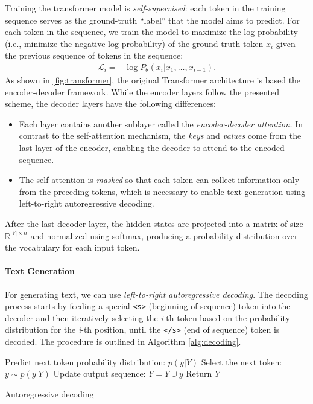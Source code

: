 {Training the transformer model is \emph{self-supervised}: each token in the training sequence serves as the ground-truth ``label'' that the model aims to predict. For each token in the sequence, we train the model to maximize the log probability (i.e., minimize the negative log probability) of the ground truth token $x_i$ given the previous sequence of tokens in the sequence:
\begin{align}
    \mathcal{L}_i = -\log P_\theta(x_i|x_1, \hdots, x_{i-1}).
\end{align}
As shown in \autoref{fig:transformer}, the original Transformer architecture is based the encoder-decoder framework. While the encoder layers follow the presented scheme, the decoder layers have the following differences:
\begin{itemize}
    \item Each layer contains another sublayer called the \emph{encoder-decoder attention}. In contrast to the self-attention mechanism, the \emph{keys} and \emph{values} come from the last layer of the encoder, enabling the decoder to attend to the encoded sequence.
    \item The self-attention is \emph{masked} so that each token can collect information only from the preceding tokens, which is necessary to enable text generation using left-to-right autoregressive decoding.
\end{itemize}
After the last decoder layer, the hidden states are projected into a matrix of size $\mathbb{R}^{|V|\times n}$ and normalized using softmax, producing a probability distribution over the vocabulary for each input token.

\paragraph{Text Generation} For generating text, we can use \textit{left-to-right autoregressive decoding}. The decoding process starts by feeding a special \texttt{<s>} (beginning of sequence) token into the decoder and then iteratively selecting the \emph{i}-th token based on the probability distribution for the \emph{i}-th position, until the  \texttt{</s>} (end of sequence) token is decoded. The procedure is outlined in Algorithm \ref{alg:decoding}.
\begin{algorithm}[ht]
    \begin{algorithmic}[1]
        \State Predict next token probability distribution: $p(y | Y)$
        \State Select the next token: $y \sim p(y | Y)$ \label{alg:dec:sample}
        \State Update output sequence: $Y = Y \cup y$
        \EndWhile
        \State Return $Y$
    \end{algorithmic}
    \caption{Autoregressive decoding}
    \label{alg:decoding}
\end{algorithm}

}
